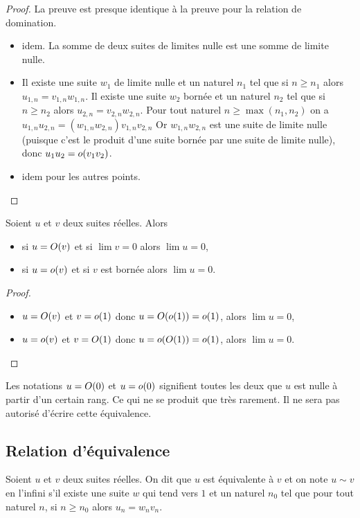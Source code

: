 \begin{proof}
  La preuve est presque identique à la preuve pour la relation de domination.
  \begin{itemize}
  \item idem. La somme de deux suites de limites nulle est une somme de limite nulle.
  \item Il existe une suite $w_1$ de limite nulle et un naturel $n_1$ tel que si $n \geqslant n_1$ alors $u_{1,n}=v_{1,n} w_{1,n}$. Il existe une suite $w_2$ bornée et un naturel $n_2$ tel que si $n \geqslant n_2$ alors $u_{2,n}=v_{2,n} w_{2,n}$. Pour tout naturel $n \geqslant \max(n_1,n_2)$ on a $u_{1,n}u_{2,n} = (w_{1,n}w_{2,n}) v_{1,n}v_{2,n}$ Or $w_{1,n}w_{2,n}$ est une suite de limite nulle (puisque c'est le produit d'une suite bornée par une suite de limite nulle), donc $u_1u_2=o\mathopen{}\left(v_1 v_2\right)$.
  \item idem pour les autres points.
  \end{itemize}
\end{proof}
\begin{prop}
  Soient $u$ et $v$ deux suites réelles. Alors
  \begin{itemize}
  \item si $u=O\mathopen{}\left(v\right)$ et si $\lim v=0$ alors $\lim u=0$,
  \item si $u=o\mathopen{}\left(v\right)$ et si $v$ est bornée alors $\lim u=0$.
  \end{itemize}
\end{prop}
\begin{proof}
  \begin{itemize}
  \item $u=O\mathopen{}\left(v\right)$ et $v=o\mathopen{}\left(1\right)$ donc $u=O\mathopen{}\left(o\mathopen{}\left(1\right)\right)=o\mathopen{}\left(1\right)$, alors $\lim u =0$,
  \item $u=o\mathopen{}\left(v\right)$ et $v=O\mathopen{}\left(1\right)$ donc $u=o\mathopen{}\left(O\mathopen{}\left(1\right)\right)=o\mathopen{}\left(1\right)$, alors $\lim u =0$.
  \end{itemize}
\end{proof}

\danger Les notations $u=O\mathopen{}\left(0\right)$ et $u=o\mathopen{}\left(0\right)$ signifient toutes les deux que $u$ est nulle à partir d'un certain rang. Ce qui ne se produit que très rarement. Il ne sera pas autorisé d'écrire cette équivalence.

\subsection{Relation d'équivalence}

\begin{defdef}
  Soient $u$ et $v$ deux suites réelles. On dit que $u$ est équivalente à $v$ et on note $u \sim v$ en l'infini s'il existe une suite $w$ qui tend vers $1$ et un naturel $n_0$ tel que pour tout naturel $n$, si $n \geqslant n_0$ alors $u_n =w_n v_n$.
\end{defdef}

